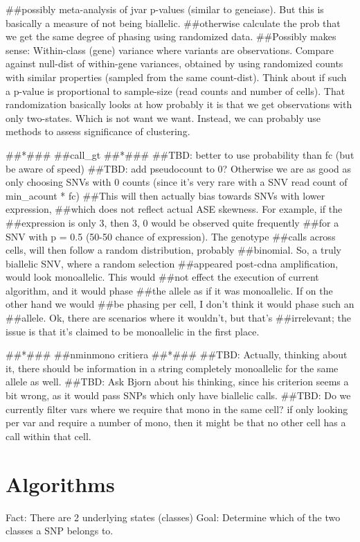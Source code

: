 ##possibly meta-analysis of jvar p-values (similar to geneiase). But
this is basically a measure of not being biallelic.
##otherwise calculate the prob that we get the same degree of phasing using randomized data.
##Possibly makes sense: Within-class (gene) variance where variants are observations. Compare
against null-dist of within-gene variances, obtained by using randomized counts with similar properties
(sampled from the same count-dist). Think about if such a p-value is
proportional to sample-size (read counts and number of cells).
That randomization basically looks at how probably it is that we get
observations with only two-states. Which is not want we want. Instead,
we can probably use methods to assess significance of clustering.

##*###
##call_gt
##*###
##TBD: better to use probability than fc (but be aware of speed)
##TBD: add pseudocount to 0? Otherwise we are as good as only choosing SNVs with 0 counts (since it's very rare with a SNV read count of min_acount * fc)
##This will then actually bias towards SNVs with lower expression,
##which does not reflect actual ASE skewness. For example, if the
##expression is only 3, then {3, 0} would be observed quite frequently
##for a SNV with p = 0.5 (50-50 chance of expression). The genotype
##calls across cells, will then follow a random distribution, probably
##binomial. So, a truly biallelic SNV, where a random selection
##appeared post-cdna amplification, would look monoallelic. This would
##not effect the execution of current algorithm, and it would phase
##the allele as if it was monoallelic. If on the other hand we would
##be phasing per cell, I don't think it would phase such an
##allele. Ok, there are scenarios where it wouldn't, but that's
##irrelevant; the issue is that it's claimed to be monoallelic in the first place.

##*###
##nminmono critiera
##*###
##TBD: Actually, thinking about it, there should be information in a string completely monoallelic for the same allele as well.
##TBD: Ask Bjorn about his thinking, since his criterion seems a bit wrong, as it would pass SNPs which only have biallelic calls.
##TBD: Do we currently filter vars where we require that mono in the
same cell? if only looking per var and require a number of mono, then
it might be that no other cell has a call within that cell.


\section{Algorithms}
Fact: There are 2 underlying states (classes)
Goal: Determine which of the two classes a SNP belongs to.

